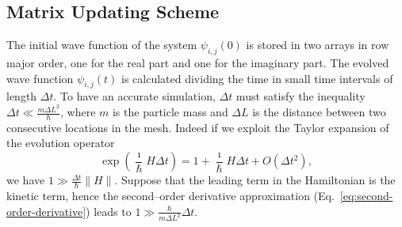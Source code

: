\subsection{Matrix Updating Scheme}
The initial wave function of the system $\psi_{i,j}(0)$ is stored in two arrays in row major order, one for the real part and one for the imaginary part. The evolved wave function $\psi_{i,j}(t)$ is calculated dividing the time in small time intervals of length $\Delta t$. To have an accurate simulation, $\Delta t$ must satisfy the inequality $\Delta t \ll \frac{m \Delta L^2}{\hbar}$, where $m$ is the particle mass and $\Delta L$ is the distance between two consecutive locations in the mesh. Indeed if we exploit the Taylor expansion of the evolution operator
\begin{equation}
\exp \left( \frac{\imath}{\hbar}H\Delta t \right) = 1 + \frac{\imath}{\hbar}H\Delta t + O(\Delta t^2),
\end{equation} 
we have $1 \gg \frac{\Delta t}{\hbar}\| H \| $. Suppose that the leading term in the Hamiltonian is the kinetic term, hence the second--order derivative approximation (Eq.~\eqref{eq:second-order-derivative}) leads to $1 \gg \frac{\hbar}{m \Delta L^2} \Delta t$.

